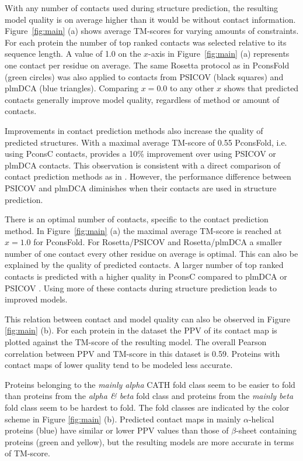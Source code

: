 \documentclass{bioinfo}
\begin{document}
With any number of contacts used during structure prediction, the
resulting model quality is on average higher than it would be without
contact information. Figure~\ref{fig:main} (a) shows average TM-scores
for varying amounts of constraints. For each protein the number of top
ranked contacts was selected relative to its sequence length. A value
of 1.0 on the $x$-axis in Figure~\ref{fig:main} (a) represents one
contact per residue on average. The same Rosetta protocol as in
PconsFold (green circles) was also applied to contacts from PSICOV
(black squares) and plmDCA (blue triangles). Comparing $x=0.0$ to any
other $x$ shows that predicted contacts generally improve model
quality, regardless of method or amount of contacts. 


Improvements in contact prediction methods also increase the quality
of predicted structures. With a maximal average TM-score of 0.55
PconsFold, i.e. using PconsC contacts, provides a 10\% improvement
over using PSICOV or plmDCA contacts. This observation is consistent
with a direct comparison of contact prediction methods as in
\citeauthor{skwark_PconsC:_2013}
\citeyear{skwark_PconsC:_2013}. However, the performance difference
between PSICOV and plmDCA diminishes when their contacts are used in
structure prediction. 


There is an optimal number of contacts, specific to the contact
prediction method. In Figure~\ref{fig:main} (a) the maximal average
TM-score is reached at $x=1.0$ for PconsFold. For Rosetta/PSICOV and
Rosetta/plmDCA a smaller number of one contact every other residue on
average is optimal. This can also be explained by the quality of
predicted contacts. A larger number of top ranked contacts is
predicted with a higher quality in PconsC compared to plmDCA or PSICOV
\cite[]{skwark_PconsC:_2013}. Using more of these contacts during
structure prediction leads to improved models. 


This relation between contact and model quality can also be observed
in Figure \ref{fig:main} (b). For each protein in the dataset the PPV
of its contact map is plotted against the TM-score of the resulting
model. The overall Pearson correlation between PPV and TM-score in
this dataset is 0.59. Proteins with contact maps of lower quality tend
to be modeled less accurate. 


Proteins belonging to the {\it
  mainly alpha} CATH fold class seem to be easier to fold than
proteins from the {\it alpha \& beta} fold class and proteins from the
{\it mainly beta} fold class seem to be hardest to fold. The fold
classes are indicated by the color scheme in Figure \ref{fig:main}
(b). Predicted contact maps in mainly $\alpha$-helical proteins (blue)
have similar or lower PPV values than those of $\beta$-sheet
containing proteins (green and yellow), but the resulting models are
more accurate in terms of TM-score.
\end{document}
